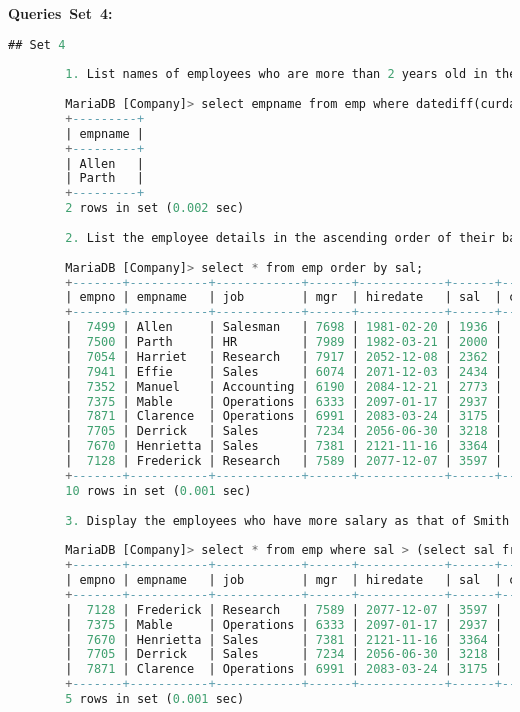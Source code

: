 \documentclass{article}
\begin{document}
	\textbf{Queries Set 4:} 
	\begin{lstlisting}[language=SQL] 
		## Set 4 
		
		1. List names of employees who are more than 2 years old in the company. 
		
		MariaDB [Company]> select empname from emp where datediff(curdate(), hiredate)/365 > 2; 
		+---------+ 
		| empname | 
		+---------+ 
		| Allen   | 
		| Parth   | 
		+---------+ 
		2 rows in set (0.002 sec) 
		
		2. List the employee details in the ascending order of their basic salary. 
		
		MariaDB [Company]> select * from emp order by sal; 
		+-------+-----------+------------+------+------------+------+------+--------+ 
		| empno | empname   | job        | mgr  | hiredate   | sal  | comm | deptno | 
		+-------+-----------+------------+------+------------+------+------+--------+ 
		|  7499 | Allen     | Salesman   | 7698 | 1981-02-20 | 1936 |  300 |     30 | 
		|  7500 | Parth     | HR         | 7989 | 1982-03-21 | 2000 |  300 |     60 | 
		|  7054 | Harriet   | Research   | 7917 | 2052-12-08 | 2362 |  229 |     20 | 
		|  7941 | Effie     | Sales      | 6074 | 2071-12-03 | 2434 |  265 |     30 | 
		|  7352 | Manuel    | Accounting | 6190 | 2084-12-21 | 2773 |  253 |     10 | 
		|  7375 | Mable     | Operations | 6333 | 2097-01-17 | 2937 |  210 |     40 | 
		|  7871 | Clarence  | Operations | 6991 | 2083-03-24 | 3175 |  228 |     40 | 
		|  7705 | Derrick   | Sales      | 7234 | 2056-06-30 | 3218 |  208 |     30 | 
		|  7670 | Henrietta | Sales      | 7381 | 2121-11-16 | 3364 |  217 |     30 | 
		|  7128 | Frederick | Research   | 7589 | 2077-12-07 | 3597 |  203 |     20 | 
		+-------+-----------+------------+------+------------+------+------+--------+ 
		10 rows in set (0.001 sec) 
		
		3. Display the employees who have more salary as that of Smith 
		
		MariaDB [Company]> select * from emp where sal > (select sal from emp where empname = 'Manuel'); 
		+-------+-----------+------------+------+------------+------+------+--------+ 
		| empno | empname   | job        | mgr  | hiredate   | sal  | comm | deptno | 
		+-------+-----------+------------+------+------------+------+------+--------+ 
		|  7128 | Frederick | Research   | 7589 | 2077-12-07 | 3597 |  203 |     20 | 
		|  7375 | Mable     | Operations | 6333 | 2097-01-17 | 2937 |  210 |     40 | 
		|  7670 | Henrietta | Sales      | 7381 | 2121-11-16 | 3364 |  217 |     30 | 
		|  7705 | Derrick   | Sales      | 7234 | 2056-06-30 | 3218 |  208 |     30 | 
		|  7871 | Clarence  | Operations | 6991 | 2083-03-24 | 3175 |  228 |     40 | 
		+-------+-----------+------------+------+------------+------+------+--------+ 
		5 rows in set (0.001 sec) 
		

\end{lstlisting}
\end{document}
